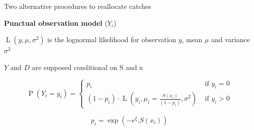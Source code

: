 \documentclass[
  10pt,
  ignorenonframetext,
]{beamer}
\begin{document}
\begin{frame}{Two alternative procedures to reallocate catches}
\protect\hypertarget{two-alternative-procedures-to-reallocate-catches-1}{}

\textbf{Punctual observation model} (\(Y_i\))

\scriptsize \(\operatorname{L}(y,\mu,\sigma^2)\) is the lognormal
likelihood for observation \(y\), mean \(\mu\) and variance \(\sigma^2\)

\(Y\) and \(D\) are supposed conditional on S and x \footnotesize

\[
\operatorname{P}\left(Y_i=y_{i} \right) =
\left\{
    \begin{array}{ll}
        p_i & \text { if } y_{i}=0 \\
        \left(1-p_i\right) \cdot \operatorname{L}\left(y_{i },\mu_i=\frac{S(x_i)}{\left(1 - p_i\right)},\sigma^{2} \right) & \text { if } y_{i} > 0
    \end{array}
\right.
\]

\[p_{i}=\exp(-e^\xi .S(x_{i}))\]

\normalsize \vspace{\baselineskip} \vspace{\baselineskip}


\end{frame}
\end{document}
